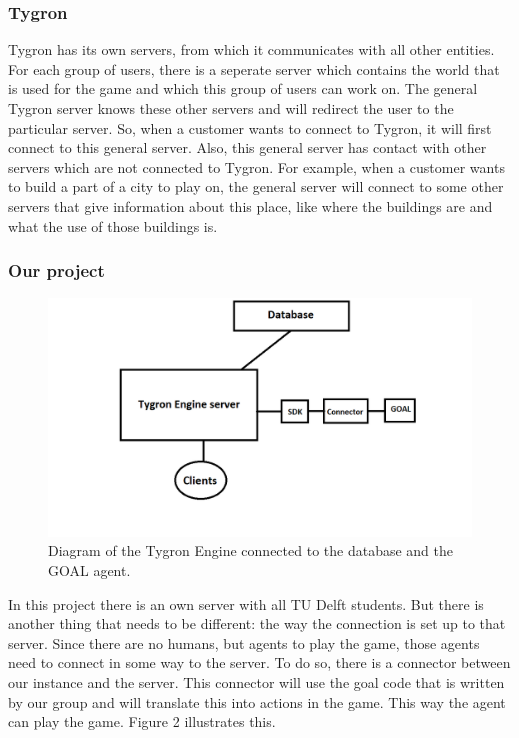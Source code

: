 \subsubsection{Tygron}
Tygron has its own servers, from which it communicates with all other entities. For each group of users, there is a seperate server which contains the world that is used for the game and which this group of users can work on. The general Tygron server knows these other servers and will redirect the user to the particular server. So, when a customer wants to connect to Tygron, it will first connect to this general server. Also, this general server has contact with other servers which are not connected to Tygron. For example, when a customer wants to build a part of a city to play on, the general server will connect to some other servers that give information about this place, like where the buildings are and what the use of those buildings is. 

\subsubsection{Our project}
\begin{figure}[h!]
  \centering
  \includegraphics[scale=0.55]{Tygrondatabase3.png}
  \caption{Diagram of the Tygron Engine connected to the database and the GOAL agent.}
  \label{fig:tygron2}
\end{figure}
In this project there is an own server with all TU Delft students. But there is another thing that needs to be different: the way the connection is set up to that server. Since there are no humans, but agents to play the game, those agents need to connect in some way to the server. To do so, there is a connector between our instance and the server. This connector will use the goal code that is written by our group and will translate this into actions in the game. This way the agent can play the game. Figure 2 illustrates this.

